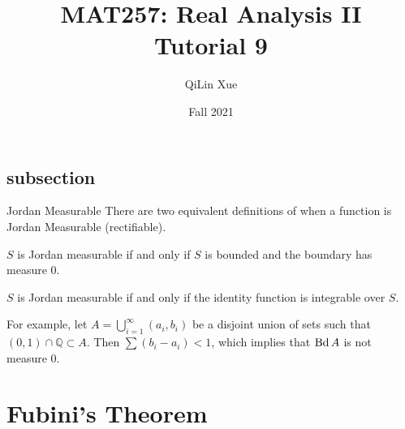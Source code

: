 \documentclass{article}
\title{MAT257: Real Analysis II \\ \textbf{Tutorial 9}}
\author{QiLin Xue}
\date{Fall 2021}
\begin{document}
\maketitle
\subsection*{subsection}{Jordan Measurable}
There are two equivalent definitions of when a function is Jordan Measurable (rectifiable).
\begin{definition}
    $S$ is Jordan measurable if and only if $S$ is bounded and the boundary has measure $0$. 
\end{definition}
\begin{definition}
    $S$ is Jordan measurable if and only if the identity function is integrable over $S$.
\end{definition}
For example, let $A = \bigcup_{i=1}^\infty (a_i, b_i)$ be a disjoint union of sets such that $(0,1) \cap \mathbb{Q} \subset A$. Then $\sum (b_i-a_i) < 1$, which implies that $\operatorname{Bd} A$ is not measure $0$.

\section{Fubini's Theorem}
\end{document}
